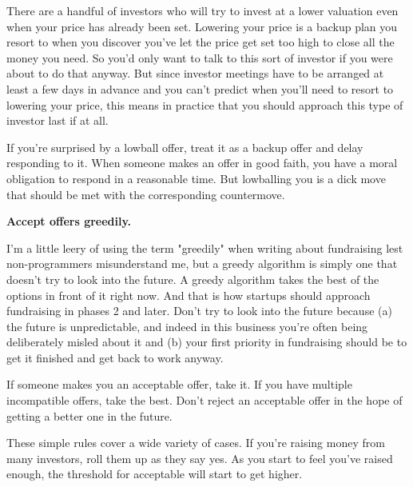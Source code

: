 There are a handful
                    of investors who will try to invest at a lower valuation
                    even when your price has already been set. Lowering your
                    price is a backup plan you resort to when you discover
                    you've let the price get set too high to close all the money
                    you need. So you'd only want to talk to this sort of
                    investor if you were about to do that anyway. But since
                    investor meetings have to be arranged at least a few days in
                    advance and you can't predict when you'll need to resort to
                    lowering your price, this means in practice that you should
                    approach this type of investor last if at all.

If
                    you're surprised by a lowball offer, treat it as a backup
                    offer and delay responding to it. When someone makes an
                    offer in good faith, you have a moral obligation to respond
                    in a reasonable time. But lowballing you is a dick move that
                    should be met with the corresponding countermove.


                    \textbf{Accept offers greedily.}

I'm a little leery
                    of using the term "greedily" when writing about fundraising
                    lest non-programmers misunderstand me, but a greedy
                    algorithm is simply one that doesn't try to look into the
                    future. A greedy algorithm takes the best of the options in
                    front of it right now. And that is how startups should
                    approach fundraising in phases 2 and later. Don't try to
                    look into the future because (a) the future is
                    unpredictable, and indeed in this business you're often
                    being deliberately misled about it and (b) your first
                    priority in fundraising should be to get it finished and get
                    back to work anyway.

If someone makes you an
                    acceptable offer, take it. If you have multiple incompatible
                    offers, take the best. Don't reject an acceptable offer in
                    the hope of getting a better one in the future.

These
                    simple rules cover a wide variety of cases. If you're
                    raising money from many investors, roll them up as they say
                    yes. As you start to feel you've raised enough, the
                    threshold for acceptable will start to get higher.

